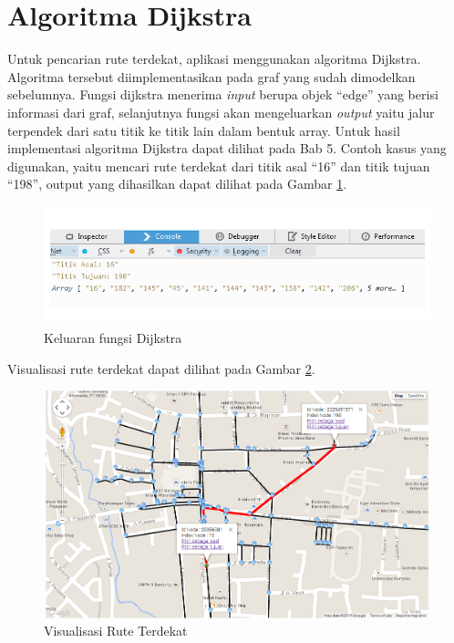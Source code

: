 \section{Algoritma Dijkstra}
Untuk pencarian rute terdekat, aplikasi menggunakan algoritma Dijkstra.
Algoritma tersebut diimplementasikan pada graf yang sudah dimodelkan
sebelumnya. Fungsi dijkstra menerima \textit{input} berupa objek ``edge''
yang berisi informasi dari graf, selanjutnya fungsi akan mengeluarkan \textit{output}
yaitu jalur terpendek dari satu titik ke titik lain dalam bentuk array. Untuk
hasil implementasi algoritma Dijkstra dapat dilihat pada Bab 5. Contoh kasus
yang digunakan, yaitu mencari rute terdekat dari titik asal ``16'' dan 
titik tujuan ``198'', output yang dihasilkan dapat dilihat pada Gambar
\ref{fig:output_dijkstra}.
\begin{figure}[h]
\centering
\includegraphics[scale=0.9]{Gambar/output_dijkstra}
\caption[Keluaran fungsi Dijkstra]{Keluaran fungsi Dijkstra}
\label{fig:output_dijkstra}
\end{figure}
Visualisasi rute terdekat dapat dilihat pada Gambar
\ref{fig:visualisasi_dijkstra}.
 \begin{figure}[h]
\centering
\includegraphics[scale=0.6]{Gambar/visualisasi_dijkstra}
\caption[Visualisasi Rute Terdekat]{Visualisasi Rute Terdekat}
\label{fig:visualisasi_dijkstra}
\end{figure}

